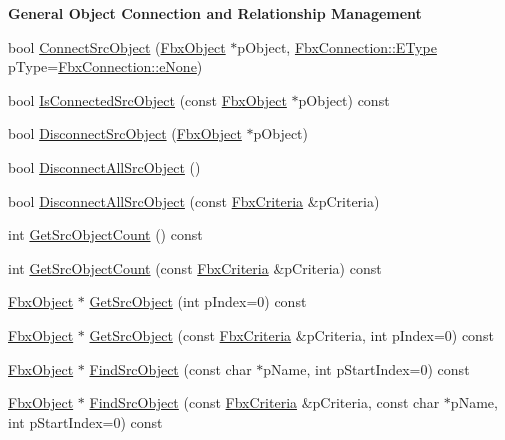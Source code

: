 \begin{Indent}\textbf{ General Object Connection and Relationship Management}\par
\begin{DoxyCompactItemize}
\item 
bool \hyperlink{class_fbx_object_a1c75d466c5166486787bfa06b4fd221f}{Connect\+Src\+Object} (\hyperlink{class_fbx_object}{Fbx\+Object} $\ast$p\+Object, \hyperlink{class_fbx_connection_a3df448a5db356652ab99fd2be2553749}{Fbx\+Connection\+::\+E\+Type} p\+Type=\hyperlink{class_fbx_connection_a3df448a5db356652ab99fd2be2553749a47aa04870c3c0769263e3972e67e9ebe}{Fbx\+Connection\+::e\+None})
\item 
bool \hyperlink{class_fbx_object_a2ff6d4507136a693622a7d8434b440ed}{Is\+Connected\+Src\+Object} (const \hyperlink{class_fbx_object}{Fbx\+Object} $\ast$p\+Object) const
\item 
bool \hyperlink{class_fbx_object_a1ff942832a9a9d829988c757899b6655}{Disconnect\+Src\+Object} (\hyperlink{class_fbx_object}{Fbx\+Object} $\ast$p\+Object)
\item 
bool \hyperlink{class_fbx_object_af1e035b53794520b66c3240a20660b40}{Disconnect\+All\+Src\+Object} ()
\item 
bool \hyperlink{class_fbx_object_ad6c02944e76b8d6780e734383f872a7d}{Disconnect\+All\+Src\+Object} (const \hyperlink{class_fbx_criteria}{Fbx\+Criteria} \&p\+Criteria)
\item 
int \hyperlink{class_fbx_object_a5fce56e85d5e0568243a5df99dabb42f}{Get\+Src\+Object\+Count} () const
\item 
int \hyperlink{class_fbx_object_aa1fe90887d90288ee0c06121ec79c0a8}{Get\+Src\+Object\+Count} (const \hyperlink{class_fbx_criteria}{Fbx\+Criteria} \&p\+Criteria) const
\item 
\hyperlink{class_fbx_object}{Fbx\+Object} $\ast$ \hyperlink{class_fbx_object_a655ed30675d9bf1686ec075f5e7c7a84}{Get\+Src\+Object} (int p\+Index=0) const
\item 
\hyperlink{class_fbx_object}{Fbx\+Object} $\ast$ \hyperlink{class_fbx_object_aff6aab5c2f62092af5a36d6720e3db25}{Get\+Src\+Object} (const \hyperlink{class_fbx_criteria}{Fbx\+Criteria} \&p\+Criteria, int p\+Index=0) const
\item 
\hyperlink{class_fbx_object}{Fbx\+Object} $\ast$ \hyperlink{class_fbx_object_a4d79f8261eb00b343c59563d2aa720d5}{Find\+Src\+Object} (const char $\ast$p\+Name, int p\+Start\+Index=0) const
\item 
\hyperlink{class_fbx_object}{Fbx\+Object} $\ast$ \hyperlink{class_fbx_object_abc939951e2e0de886642e2845f72b71d}{Find\+Src\+Object} (const \hyperlink{class_fbx_criteria}{Fbx\+Criteria} \&p\+Criteria, const char $\ast$p\+Name, int p\+Start\+Index=0) const

\end{DoxyCompactItemize}
\end{Indent}
